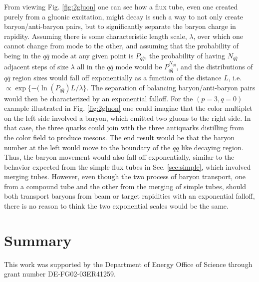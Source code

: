 \documentclass[aps, prc, 12pt, nofootinbib, showpacs, superscriptaddress, tightenlines, groupedaddress]{revtex4-2}
\begin{document}
From viewing Fig. \ref{fig:2gluon} one can see how a flux tube, even one created purely from a gluonic excitation, might decay is such a way to not only create baryon/anti-baryon pairs, but to significantly separate the baryon charge in rapidity. Assuming there is some characteristic length scale, $\lambda$, over which one cannot change from mode to the other, and assuming that the probability of being in the $q\bar{q}$ mode at any given point is $P_{q\bar{q}}$, the probability of having $N_{q\bar{q}}$  adjacent steps of size $\lambda$ all in the $q\bar{q}$ mode would be $P_{q\bar{q}}^{N_{q\bar{q}}}$, and the distributions of $q\bar{q}$ region sizes would fall off exponentially as a function of the distance $L$, i.e. $\propto \exp\{-(\ln(P_{q\bar{q}})L/\lambda\}$. The separation of balancing baryon/anti-baryon pairs would then be characterized by an exponential falloff. For the $(p=3,q=0)$ example illustrated in Fig. \ref{fig:2gluon} one could imagine that the color multiplet on the left side involved a baryon, which emitted two gluons to the right side. In that case, the three quarks could join with the three antiquarks distilling from the color field to produce mesons. The end result would be that the baryon number at the left would move to the boundary of the $q\bar{q}$ like decaying region. Thus, the baryon movement would also fall off exponentially, similar to the behavior expected from the simple flux tubes in Sec. \ref{sec:simple}, which involved merging tubes. However, even though the two process of baryon transport, one from a compound tube and the other from the merging of simple tubes, should both transport baryons from beam or target rapidities with an exponential falloff, there is no reason to think the two exponential scales would be the same.

\section{Summary}



\begin{acknowledgments}
This work was supported by the Department of Energy Office of Science through grant number DE-FG02-03ER41259.
\end{acknowledgments}


\end{document}
